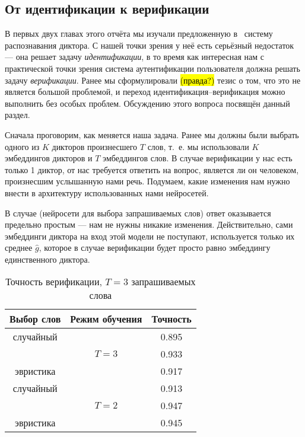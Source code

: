 \subsection{От идентификации к верификации}

В первых двух главах этого отчёта мы изучали предложенную в~\citeisr{} систему
распознавания диктора. С нашей точки зрения у неё есть серьёзный недостаток ---
она решает задачу \emph{идентификации}, в то время как интересная нам с
практической точки зрения система аутентификации пользователя должна решать
задачу \emph{верификации}. Ранее мы сформулировали \hl{(правда?)} тезис о том,
что это не является большой проблемой, и переход идентификация--верификация
можно выполнить без особых проблем. Обсуждению этого вопроса посвящён данный
раздел.

Сначала проговорим, как меняется наша задача. Ранее мы должны были выбрать
одного из $K$ дикторов произнесшего $T$ слов, т.~е. мы использовали $K$
эмбеддингов дикторов и $T$ эмбеддингов слов. В случае верификации у нас есть
только 1 диктор, от нас требуется ответить на вопрос, является ли он человеком,
произнесшим услышанную нами речь. Подумаем, какие изменения нам нужно внести
в архитектуру использованных нами нейросетей.

В случае \enquirer{} (нейросети для выбора запрашиваемых слов) ответ оказывается
предельно простым --- нам не нужны никакие изменения. Действительно, сами
эмбеддинги диктора на вход этой модели не поступают, используется только их
среднее $\hat{g}$, которое в случае верификации будет просто равно эмбеддингу
единственного диктора.

\begin{table}[htb]
    \centering
    \begin{tabular}{c c c}
        \toprule
        Выбор слов & Режим обучения & Точность\\
        \midrule
        случайный & \multirow{3}{4em}{$T = 3$} & 0.895 \\
        \enquirer{} & & 0.933\\
        эвристика & & 0.917\\
        \midrule
        случайный & \multirow{3}{4em}{$T = 2$} & 0.913 \\
        \enquirer{} & & 0.947\\
        эвристика & & 0.945\\
        \bottomrule
    \end{tabular}
    \caption{Точность верификации, $T = 3$ запрашиваемых слова}
    \label{tab:ver}
\end{table}

